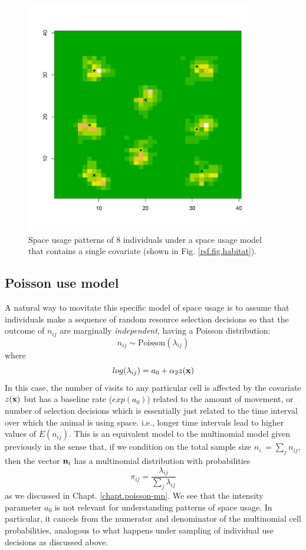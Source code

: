 \begin{figure}[htp]
\centering
\includegraphics[width=4in,height=4in]{Ch10b/figs/homeranges8}
\caption{Space usage patterns of 8 individuals under a space usage
  model that contains a single covariate (shown in
  Fig. \ref{rsf.fig.habitat}).
}
\label{rsf.fig.homeranges}
\end{figure}



\subsection{Poisson use model}

A natural way to movitate this specific model of space usage is to
assume that individuals make a sequence of random resource selection
decisions so that the outcome of $n_{ij}$ are marginally {\it
  independent}, having a Poisson distribution:
\[
 n_{ij} \sim \mbox{Poisson}( \lambda_{ij})
\]
where
\[
 log(\lambda_{ij}) = a_{0}  + \alpha_{2} z({\bf x})
\]
In this case,
 the number of visits to any particular cell is affected by
the covariate $z({\bf x})$ but has a baseline rate ($exp(a_{0})$) related to the amount
of movement, or number of selection decisions which is essentially
just related to the time interval over which the animal is using
space. i.e., longer time intervals lead to higher values of
$E(n_{ij})$.
This is an equivalent model to the multinomial model given previously
in the sense that, if we condition on the total sample size $n_{i.} =
\sum_{j} n_{ij}$, then the vector ${\bf n}_{i}$ has a multinomial
distribution with probabilities
\[
 \pi_{ij} = \frac{\lambda_{ij}}{ \sum_{j} \lambda_{ij}}
\]
as we discussed in Chapt. \ref{chapt.poisson-mn}.  We see that the
intensity parameter $a_{0}$ is not relevant for understanding
patterns of space usage. In particular, it cancels from the numerator
and denominator of the multinomial cell probabilities, analogous to
what happens under sampling of individual use decisions as discussed
above. 

